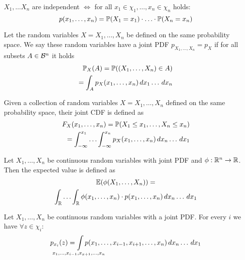 \begin{proposition}
  \(X_1, \ldots X_n\) are independent \(\iff\) for all \(x_1 \in \chi_1, \ldots, x_n \in \chi_n\) holds: \[p(x_1, \ldots, x_n) = \P(X_1 = x_1) \cdot \ldots \cdot \P(X_n = x_n)\]
\end{proposition}

\begin{cdefinition*}
  Let the random variables \(X = X_1, \ldots, X_n\) be defined on the same probability space. We say these random variables have a joint PDF \(p_{X_1, \ldots, X_n} = p_X\) if for all subsets \(A \in \B^n\) it holds
  \begin{align*}
    \P_X(A) = \P((X_1, \ldots, X_n) \in A) \\
    = \int_A p_X(x_1, \ldots, x_n) \, dx_1 \ldots \,dx_n
  \end{align*}
\end{cdefinition*}

\begin{cdefinition*}
  Given a collection of random variables \(X = X_1, \ldots, X_n\) defined on the same probability space, their joint CDF is defined as
  \begin{align*}
    F_{X}(x_1, \ldots, x_n) = \P(X_1 \leq x_1, \ldots, X_n \leq x_n) \\
    = \int_{-\infty}^{x_1} \ldots \int_{-\infty}^{x_n} p_{X}(x_1, \ldots, x_n) \,dx_n \ldots \, dx_1
  \end{align*}
\end{cdefinition*}

\begin{proposition}
  Let \(X_1, \ldots, X_n\) be continuous random variables with joint PDF and \(\phi: \R^n \to \R\). Then the expected value is defined as
  \begin{multline*}
    \E(\phi(X_1, \ldots, X_n)) = \\ \int_\R \ldots \int_\R \phi(x_1, \ldots, x_n) \cdot p(x_1, \ldots, x_n) \, dx_n \ldots \, dx_1
  \end{multline*}
\end{proposition}

\begin{ctheorem*}
  Let \(X_1, \ldots, X_n\) be continuous random variables with a joint PDF. For every \(i\) we have \(\forall z \in \chi_i\):
  \[p_{x_i}(z) = \smashoperator{\int_{x_1, \ldots, x_{i-1}, x_{x+1}, \ldots, x_n}} p(x_1, \ldots, x_{i-1}, x_{i+1}, \ldots, x_n) \, dx_n \ldots \, dx_1\]
\end{ctheorem*}

